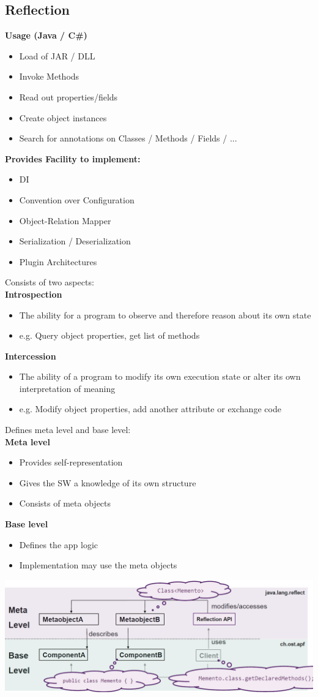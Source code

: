\subsection{Reflection}
\textbf{Usage (Java / C\#)}
\begin{itemize}
    \item Load of JAR / DLL
    \item Invoke Methods 
    \item Read out properties/fields 
    \item Create object instances 
    \item Search for annotations on Classes / Methods / Fields / ...
\end{itemize}
\textbf{Provides Facility to implement:}
\begin{itemize}
    \item DI
    \item Convention over Configuration
    \item Object-Relation Mapper
    \item Serialization / Deserialization
    \item Plugin Architectures
\end{itemize}
Consists of two aspects:\\ 
\textbf{Introspection}
\begin{itemize}
    \item The ability for a program to observe and therefore reason about its own state
    \item e.g. Query object properties, get list of methods
\end{itemize}
\textbf{Intercession}
\begin{itemize}
    \item The ability of a program to modify its own execution state or alter its own interpretation of meaning
    \item e.g. Modify object properties, add another attribute or exchange code
\end{itemize}
Defines meta level and base level:\\ 
\textbf{Meta level}
\begin{itemize}
    \item Provides self-representation
    \item Gives the SW a knowledge of its own structure
    \item Consists of meta objects
\end{itemize}
\textbf{Base level}
\begin{itemize}
    \item Defines the app logic
    \item Implementation may use the meta objects
\end{itemize}
\includegraphics[width=\linewidth]{./img/meta_base_level.png}
